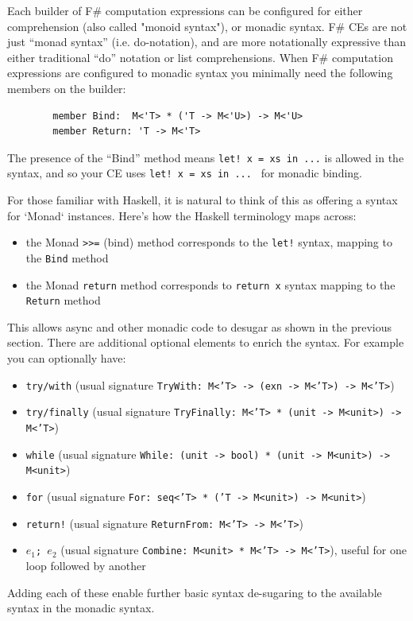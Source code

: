 \documentclass[acmsmall]{acmart}\settopmatter{}
\begin{document}
Each builder of F\# computation expressions can be configured for either comprehension (also called "monoid syntax"), or monadic syntax. 
F\# CEs are not just ``monad syntax'' (i.e. do-notation), and are more notationally expressive than
either traditional ``do'' notation or list comprehensions.
When F\# computation expressions are configured to monadic syntax you minimally need the following members on the builder:
\begin{verbatim}
        member Bind:  M<'T> * ('T -> M<'U>) -> M<'U>
        member Return: 'T -> M<'T>
\end{verbatim}
The presence of the ``Bind'' method means \texttt{let! x = xs in  ...} is allowed in the syntax, and so your CE uses \texttt{let! x = xs in  ... } for monadic binding. 

For those familiar with Haskell, it is natural to think of this as offering a syntax for `Monad`
instances.  Here’s how the Haskell terminology maps across:
\begin{itemize}
\item the Monad \texttt{>>=} (bind) method corresponds to the \texttt{let!} syntax, mapping to the \texttt{Bind} method
\item the Monad \texttt{return} method corresponds to \texttt{return x} syntax mapping to the \texttt{Return} method
\end{itemize}
This allows async and other monadic code to desugar as shown in the previous section. There are additional optional elements to enrich the syntax. For example you can optionally have:
\begin{itemize}
\item \texttt{try/with} (usual signature \texttt{TryWith: M<'T> -> (exn -> M<'T>) -> M<'T>})
\item \texttt{try/finally}  (usual signature \texttt{TryFinally: M<'T> * (unit -> M<unit>) -> M<'T>})
\item \texttt{while} (usual signature \texttt{While: (unit -> bool) * (unit -> M<unit>) -> M<unit>})
\item \texttt{for} (usual signature \texttt{For: seq<'T> * ('T -> M<unit>) -> M<unit>})
\item \texttt{return!} (usual signature \texttt{ReturnFrom: M<'T> -> M<'T>})
\item \texttt{$e_1$; $e_2$} (usual signature \texttt{Combine: M<unit> * M<'T> -> M<'T>}), useful for one loop followed by another 
\end{itemize}
Adding each of these enable further basic syntax de-sugaring to the available syntax in the monadic syntax.
\end{document}
